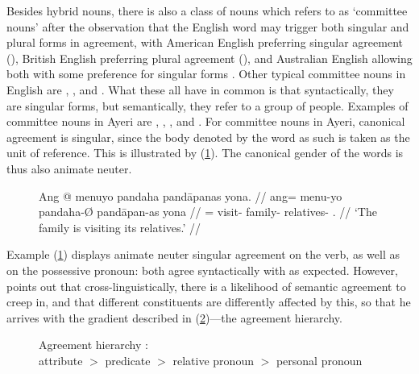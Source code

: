 

Besides hybrid nouns, there is also a class of nouns which \citet{corbett2006}
refers to as `committee nouns' after the observation that the English word 
 may trigger both singular and plural forms in agreement, with
American English preferring singular agreement (), British English preferring plural agreement (), and Australian English allowing both with some
preference for singular forms \citep[212--213]{corbett2006}. Other typical
committee nouns in English are , , and .
What these all have in common is that syntactically, they are singular forms,
but semantically, they refer to a group of people. Examples of committee nouns
in Ayeri are , ,
, and .
For committee nouns in Ayeri, canonical agreement is singular, since the body
denoted by the word as such is taken as the unit of reference. This is
illustrated by (\ref{ex:ayrcommitteenoun}). The canonical gender of the words
is thus also animate neuter.

\begin{figure}[h]
\ex\label{ex:ayrcommitteenoun}\begingl
	\gla Ang @ menuyo pandaha pandāpanas yona. //
	\glb ang= menu-yo pandaha-Ø pandāpan-as yona //
	\glc \AgtT{}= visit-\TsgN{} family-\Top{} relatives-\Parg{} 
		\TsgN{}.\Gen{} //
	\glft `The family is visiting its relatives.' //
\endgl\xe
\end{figure}

Example (\ref{ex:ayrcommitteenoun}) displays animate neuter singular agreement
on the verb, as well as on the possessive pronoun: both agree syntactically
with  as expected. However, \citet{corbett2006}
points out that cross-linguistically, there is a likelihood of semantic
agreement to creep in, and that different constituents are differently affected
by this, so that he arrives with the gradient described in
(\ref{ex:agrhier})---the agreement hierarchy.

\begin{figure}[h]
\ex\label{ex:agrhier}%
	Agreement hierarchy \citep[206\psqq]{corbett2006}:\medskip\\
	attribute $>$ predicate $>$ relative pronoun $>$ personal pronoun
\xe
\end{figure}

